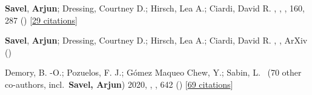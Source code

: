 \item[{\color{numcolor}\scriptsize3}] \textbf{Savel}, \textbf{Arjun}; Dressing, Courtney D.; Hirsch, Lea A.; Ciardi, David R. , , \aj, {160}, 287 () [\href{https://ui.adsabs.harvard.edu/abs/2020AJ....160..287S}{29 citations}]

\item[{\color{numcolor}\scriptsize2}] \textbf{Savel}, \textbf{Arjun}; Dressing, Courtney D.; Hirsch, Lea A.; Ciardi, David R. , , ArXiv ()

\item[{\color{numcolor}\scriptsize1}] Demory, B. -O.; Pozuelos, F. J.; G{\'o}mez Maqueo Chew, Y.; Sabin, L. \etal\ ({70} other co-authors, incl.\ \textbf{Savel, Arjun}) 2020, , \aanda, {642} () [\href{https://ui.adsabs.harvard.edu/abs/2020A&A...642A..49D}{69 citations}]